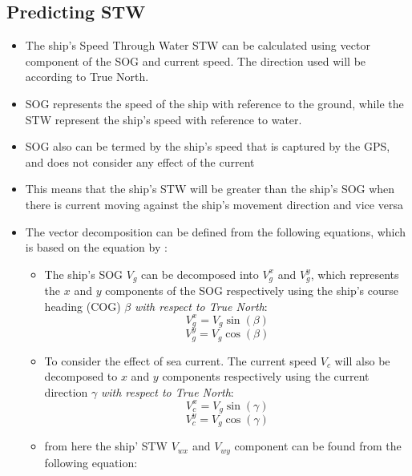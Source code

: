 \subsection{Predicting STW}
\begin{itemize}
    \item The ship's Speed Through Water STW can be calculated using vector component of the SOG and current speed. The direction used will be according to True North. \cite{Yang.2020,Zhou.2020}
    \item SOG represents the speed of the ship with reference to the ground, while the STW represent the ship's speed with reference to water.
    \item SOG also can be termed by the ship's speed that is captured by the GPS, and does not consider any effect of the current
    \item This means that the ship's STW will be greater than the ship's SOG when there is current moving against the ship's movement direction and vice versa 
    \item The vector decomposition can be defined from the following equations, which is based on the equation by \cite{Yang.2020}:
    \begin{itemize}
        \item The ship's SOG $V_g$ can be decomposed into $V_{g}^x$ and $V_{g}^y$, which represents the $x$ and $y$ components of the SOG respectively using the ship's course heading (COG) $\beta$ \emph{with respect to True North}:
        \begin{equation}\label{eqvgx}
            V_{g}^x = V_g\sin(\beta)   
        \end{equation}
        \begin{equation}\label{eqvgy}
            V_{g}^y = V_g\cos(\beta)   
        \end{equation}
        \item To consider the effect of sea current. The current speed $V_c$ will also be decomposed to $x$ and $y$ components respectively using the current direction $\gamma$ \emph{with respect to True North}:
        \begin{equation}\label{eqvcx}
            V_{c}^x = V_g\sin(\gamma)   
        \end{equation}
        \begin{equation}\label{eqvcy}
            V_{c}^y = V_g\cos(\gamma)   
        \end{equation}
        \item from here the ship' STW $V_{wx}$ and $V_{wy}$ component can be found from the following equation: 

\end{itemize}
\end{itemize}
